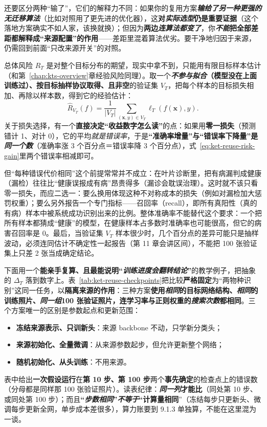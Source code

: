 还要区分两种“输了”，它们的解释力不同：如果你的复用方案\textbf{\emph{输给了另一种\emph{更强}的无迁移算法}}（比如对照用了更先进的优化器），这\textbf{对\emph{实际选型}仍是重要证据}（这个落地方案确实不如人家，该换就换）；但因为\textbf{两边\emph{连算法都变了}}，你\textbf{\emph{不能}把全部差距都解释成“来源配置”的作用}——差距里混着算法优劣。要干净地归因于来源，仍需回到前面“只改来源开关”的对照。

总体风险 $R_T$ 是对整个目标分布的期望，现实中拿不到，只能用有限目标样本估计（和第~\ref{chap:kts-overview}章经验风险同理）。取一个\textbf{\emph{不参与拟合}（模型没在上面训练过）、按目标抽样协议取得、且非空}的验证集 $V_T$，把每个样本的目标损失相加、再除以样本数，得到它的经验估计：
\[
  \hat R_{V_T}(f)
  =\frac{1}{|V_T|}
    \sum_{(\bm{x},y)\in V_T}\ell_T(f(\bm{x}),y).
\]
关于损失选择，有一个\textbf{直接决定“收益数字怎么读”}的点：如果用\textbf{零一损失}（预测错计 1、对计 0），它的平均\emph{就是错误率}，于是\textbf{“准确率增量”与“错误率下降量”是\emph{同一个数}}（准确率涨 3 个百分点＝错误率降 3 个百分点），式~\eqref{eq:ket-reuse-risk-gain}里两个错误率相减即可。

但“每种错误代价相同”这个前提常常并不成立：在叶片诊断里，把有病漏判成健康（漏检）往往比“健康误报成有病”昂贵得多（漏诊会耽误治理）。这时就不该只看零一损失，而应二选一：要么换用体现这种不对称成本的损失（例如对漏检加大惩罚权重）；要么另外报告一个专门指标——召回率（recall），即所有真阳性（真的有病）样本中被系统成功识别出来的比例。整体准确率不能替代这个要求：一个把所有样本都猜成“健康”的模型，在健康样本占多数时准确率也可能很高，但它的病害召回率是 0。最后，当验证集 $V_T$ 样本很少时，几个百分点的差异可能只是抽样波动，必须连同估计不确定性一起报告（第 11 章会讲区间），不能把 100 张验证集上只差 2 张当成确定结论。

下面用一个\textbf{能亲手复算、且最能说明“\emph{训练进度会翻转结论}”}的教学例子，把抽象的 $\Delta_T$ 落到数字上。表~\ref{tab:ket-reuse-checkpoints}把比较\textbf{严格固定}为“两物种识别”这同一任务，以\textbf{隔离来源的作用}：三种方案\textbf{使用\emph{相同}的目标网络结构、\emph{相同}的训练照片、\emph{同一组}100 张验证照片，连学习率与正则权重的\emph{搜索次数}都相同}。三个方案唯一的区别是参数起点和更新范围：
\begin{itemize}\item \textbf{冻结来源表示、只训新头}：来源 backbone 不动，只学新分类头；\item \textbf{来源初始化、全量微调}：从来源参数起步，但允许更新整个网络；\item \textbf{随机初始化、从头训练}：不用来源。\end{itemize}
表中给出\textbf{一次假设运行}在\textbf{第 10 步、第 100 步}两个\textbf{事先确定}的检查点上的错误数（分母都是同样那 100 张验证照片）。读表纪律：\textbf{\emph{同一列}才能比}（同处第 10 步、或同处第 100 步）；而且\textbf{“\emph{步数相同}”\emph{不等于}“计算量相同}”（冻结每步只更新头、微调每步更新全网，单步成本差很多），算力账要到 9.1.3 单独算，不能在这里混为一谈。

